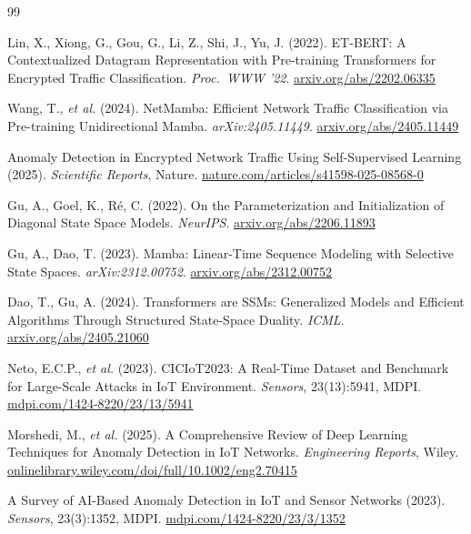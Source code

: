 \documentclass[11pt,a4paper]{article}
\begin{document}
\begin{thebibliography}{99}

 Lin, X., Xiong, G., Gou, G., Li, Z., Shi, J., Yu, J. (2022). ET-BERT: A Contextualized Datagram Representation with Pre-training Transformers for Encrypted Traffic Classification. \emph{Proc.\ WWW '22}. \href{https://arxiv.org/abs/2202.06335}{arxiv.org/abs/2202.06335}

 Wang, T., \emph{et al.} (2024). NetMamba: Efficient Network Traffic Classification via Pre-training Unidirectional Mamba. \emph{arXiv:2405.11449}. \href{https://arxiv.org/abs/2405.11449}{arxiv.org/abs/2405.11449}

 Anomaly Detection in Encrypted Network Traffic Using Self-Supervised Learning (2025). \emph{Scientific Reports}, Nature. \href{https://www.nature.com/articles/s41598-025-08568-0}{nature.com/articles/s41598-025-08568-0}

 Gu, A., Goel, K., R\'e, C. (2022). On the Parameterization and Initialization of Diagonal State Space Models. \emph{NeurIPS}. \href{https://arxiv.org/abs/2206.11893}{arxiv.org/abs/2206.11893}

 Gu, A., Dao, T. (2023). Mamba: Linear-Time Sequence Modeling with Selective State Spaces. \emph{arXiv:2312.00752}. \href{https://arxiv.org/abs/2312.00752}{arxiv.org/abs/2312.00752}

 Dao, T., Gu, A. (2024). Transformers are SSMs: Generalized Models and Efficient Algorithms Through Structured State-Space Duality. \emph{ICML}. \href{https://arxiv.org/abs/2405.21060}{arxiv.org/abs/2405.21060}

 Neto, E.C.P., \emph{et al.} (2023). CICIoT2023: A Real-Time Dataset and Benchmark for Large-Scale Attacks in IoT Environment. \emph{Sensors}, 23(13):5941, MDPI. \href{https://www.mdpi.com/1424-8220/23/13/5941}{mdpi.com/1424-8220/23/13/5941}

 Morshedi, M., \emph{et al.} (2025). A Comprehensive Review of Deep Learning Techniques for Anomaly Detection in IoT Networks. \emph{Engineering Reports}, Wiley. \href{https://onlinelibrary.wiley.com/doi/full/10.1002/eng2.70415}{onlinelibrary.wiley.com/doi/full/10.1002/eng2.70415}

 A Survey of AI-Based Anomaly Detection in IoT and Sensor Networks (2023). \emph{Sensors}, 23(3):1352, MDPI. \href{https://www.mdpi.com/1424-8220/23/3/1352}{mdpi.com/1424-8220/23/3/1352}


\end{thebibliography}
\end{document}

